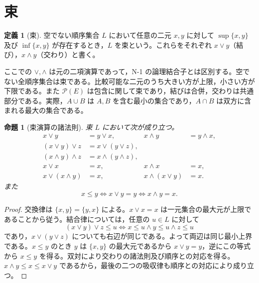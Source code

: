 \documentclass[a5paper,10pt,dvipdfmx]{jsarticle}
\theoremstyle{definition}
\newtheorem{defn}[ruledef]{定義}
\theoremstyle{plain}
\newtheorem{prop}[ruledef]{命題}
\newcommand{\iffc}{\Longleftrightarrow}
\newcommand{\Pow}{\mathcal{P}}
\begin{document}
\section{束}
\begin{defn}[束]\label{k79}
空でない順序集合 $L$ において任意の二元 $x,y$ に対して $\sup\{x,y\}$ 及び $\inf\{x,y\}$ が存在するとき，$L$ を束という。これらをそれぞれ $x\vee y$（結び），$x\wedge y$（交わり）と書く。
\end{defn}
ここでの $\vee,\wedge$ は元の二項演算であって，N-1 の論理結合子とは区別する。空でない全順序集合は束である。比較可能な二元のうち大きい方が上限，小さい方が下限である。また $\Pow(E)$ は包含に関して束であり，結びは合併，交わりは共通部分である。実際，$A\cup B$ は $A,B$ を含む最小の集合であり，$A\cap B$ は双方に含まれる最大の集合である。
\begin{prop}[束演算の諸法則]\label{k80}
束 $L$ において次が成り立つ。
\begin{align*}
 x\vee y&=y\vee x,& x\wedge y&=y\wedge x,\\
 (x\vee y)\vee z&=x\vee(y\vee z),\\
 (x\wedge y)\wedge z&=x\wedge(y\wedge z),\\
 x\vee x&=x,& x\wedge x&=x,\\
 x\vee(x\wedge y)&=x,& x\wedge(x\vee y)&=x.
\end{align*}
また
\[
 x\leq y\iffc x\vee y=y\iffc x\wedge y=x.
\]
\end{prop}
\begin{proof}
交換律は $\{x,y\}=\{y,x\}$ による。$x\vee x=x$ は一元集合の最大元が上限であることから従う。結合律については，任意の $u\in L$ に対して
\[
 (x\vee y)\vee z\leq u\iffc x\leq u\land y\leq u\land z\leq u
\]
であり，$x\vee(y\vee z)$ についても右辺が同じである。よって両辺は同じ最小上界である。$x\leq y$ のとき $y$ は $\{x,y\}$ の最大元であるから $x\vee y=y$，逆にこの等式から $x\leq y$ を得る。双対により交わりの諸法則及び順序との対応を得る。$x\wedge y\leq x\leq x\vee y$ であるから，最後の二つの吸収律も順序との対応により成り立つ。
\end{proof}
\end{document}
